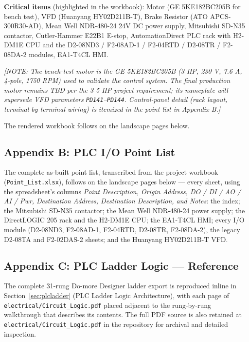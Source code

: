\documentclass[hidelinks,12pt]{article}
\newcommand{\note}[1]{\textcolor{PSUblue}{\textit{[NOTE: #1]}}}
\begin{document}
\textbf{Critical items} (highlighted in the workbook): Motor (GE 5KE182BC205B for bench
test), VFD (Huanyang HY02D211B-T), Brake Resistor (ATO APCS-300R30-AD), Mean Well
NDR-480-24 24V DC power supply, Mitsubishi SD-N35 contactor, Cutler-Hammer E22B1
E-stop, AutomationDirect PLC rack with H2-DM1E CPU and the D2-08ND3 / F2-08AD-1 /
F2-04RTD / D2-08TR / F2-08DA-2 modules, EA1-T4CL HMI.

\note{The bench-test motor is the GE 5KE182BC205B (3 HP, 230 V, 7.6 A, 4-pole, 1750
RPM) used to validate the control system. The final production motor remains TBD per
the 3-5 HP project requirement; its nameplate will supersede VFD parameters
\texttt{PD141}--\texttt{PD144}. Control-panel detail (rack layout, terminal-by-terminal
wiring) is itemized in the point list in Appendix B.}

The rendered workbook follows on the landscape pages below.



\subsection{Appendix B: PLC I/O Point List}
The complete as-built point list, transcribed from the project workbook
(\texttt{Point\_List.xlsx}), follows on the landscape pages below --- every sheet, using
the spreadsheet's columns \emph{Point Description, Origin Address, DO / DI / AO / AI /
Pwr, Destination Address, Destination Description, and Notes}: the index; the Mitsubishi
SD-N35 contactor; the Mean Well NDR-480-24 power supply; the DirectLOGIC 205 rack and
the H2-DM1E CPU; the EA1-T4CL HMI; every I/O module (D2-08ND3, F2-08AD-1, F2-04RTD,
D2-08TR, F2-08DA-2), the legacy D2-08TA and F2-02DAS-2 sheets; and the Huanyang
HY02D211B-T VFD.



\subsection{Appendix C: PLC Ladder Logic --- Reference}
\label{sec:appendix_rungs}

The complete 31-rung Do-more Designer ladder export is reproduced inline in Section~\ref{sec:plcladder} (PLC Ladder Logic Architecture), with each page of \texttt{electrical/Circuit\_Logic.pdf} placed adjacent to the rung-by-rung walkthrough that describes its contents. The full PDF source is also retained at \texttt{electrical/Circuit\_Logic.pdf} in the repository for archival and detailed inspection.
\end{document}
